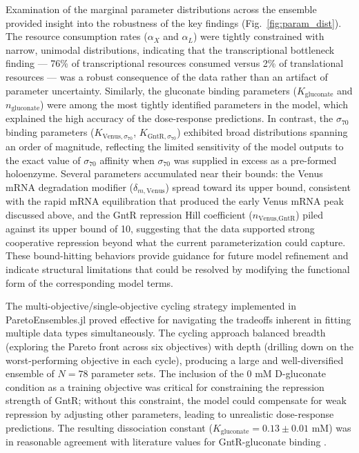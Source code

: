 \documentclass[12pt]{article}
\begin{document}
Examination of the marginal parameter distributions across the ensemble provided insight into the robustness of the key findings (Fig.~\ref{fig:param_dist}). The resource consumption rates ($\alpha_X$ and $\alpha_L$) were tightly constrained with narrow, unimodal distributions, indicating that the transcriptional bottleneck finding --- 76\% of transcriptional resources consumed versus 2\% of translational resources --- was a robust consequence of the data rather than an artifact of parameter uncertainty. Similarly, the gluconate binding parameters ($K_{\text{gluconate}}$ and $n_{\text{gluconate}}$) were among the most tightly identified parameters in the model, which explained the high accuracy of the dose-response predictions. In contrast, the $\sigma_{70}$ binding parameters ($K_{\text{Venus},\sigma_{70}}$, $K_{\text{GntR},\sigma_{70}}$) exhibited broad distributions spanning an order of magnitude, reflecting the limited sensitivity of the model outputs to the exact value of $\sigma_{70}$ affinity when $\sigma_{70}$ was supplied in excess as a pre-formed holoenzyme. Several parameters accumulated near their bounds: the Venus mRNA degradation modifier ($\delta_{m,\text{Venus}}$) spread toward its upper bound, consistent with the rapid mRNA equilibration that produced the early Venus mRNA peak discussed above, and the GntR repression Hill coefficient ($n_{\text{Venus,GntR}}$) piled against its upper bound of 10, suggesting that the data supported strong cooperative repression beyond what the current parameterization could capture. These bound-hitting behaviors provide guidance for future model refinement and indicate structural limitations that could be resolved by modifying the functional form of the corresponding model terms.

The multi-objective/single-objective cycling strategy implemented in ParetoEnsembles.jl proved effective for navigating the tradeoffs inherent in fitting multiple data types simultaneously. The cycling approach balanced breadth (exploring the Pareto front across six objectives) with depth (drilling down on the worst-performing objective in each cycle), producing a large and well-diversified ensemble of $N = 78$ parameter sets. The inclusion of the 0 mM D-gluconate condition as a training objective was critical for constraining the repression strength of GntR; without this constraint, the model could compensate for weak repression by adjusting other parameters, leading to unrealistic dose-response predictions. The resulting dissociation constant ($K_{\text{gluconate}} = 0.13 \pm 0.01$ mM) was in reasonable agreement with literature values for GntR-gluconate binding \cite{daddaoua2017identification}.
\end{document}

